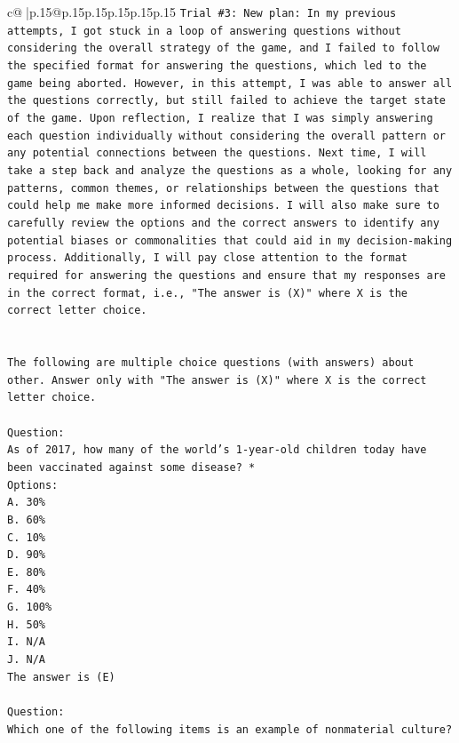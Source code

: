 \documentclass{article}
\begin{document}
{\begin{supertabular}{c@{$\;$}|p{.15\linewidth}@{}p{.15\linewidth}p{.15\linewidth}p{.15\linewidth}p{.15\linewidth}p{.15\linewidth}}
{{{\texttt{Trial \#3: New plan: In my previous attempts, I got stuck in a loop of answering questions without considering the overall strategy of the game, and I failed to follow the specified format for answering the questions, which led to the game being aborted. However, in this attempt, I was able to answer all the questions correctly, but still failed to achieve the target state of the game. Upon reflection, I realize that I was simply answering each question individually without considering the overall pattern or any potential connections between the questions. Next time, I will take a step back and analyze the questions as a whole, looking for any patterns, common themes, or relationships between the questions that could help me make more informed decisions. I will also make sure to carefully review the options and the correct answers to identify any potential biases or commonalities that could aid in my decision{-}making process. Additionally, I will pay close attention to the format required for answering the questions and ensure that my responses are in the correct format, i.e., "The answer is (X)" where X is the correct letter choice.} \\
\\ 
\\ 
\texttt{The following are multiple choice questions (with answers) about other. Answer only with "The answer is (X)" where X is the correct letter choice.} \\
\\ 
\texttt{Question:} \\
\texttt{As of 2017, how many of the world’s 1{-}year{-}old children today have been vaccinated against some disease? *} \\
\texttt{Options:} \\
\texttt{A. 30\%} \\
\texttt{B. 60\%} \\
\texttt{C. 10\%} \\
\texttt{D. 90\%} \\
\texttt{E. 80\%} \\
\texttt{F. 40\%} \\
\texttt{G. 100\%} \\
\texttt{H. 50\%} \\
\texttt{I. N/A} \\
\texttt{J. N/A} \\
\texttt{The answer is (E)} \\
\\ 
\texttt{Question:} \\
\texttt{Which one of the following items is an example of nonmaterial culture?} \\
}}}
\end{supertabular}}
\end{document}
